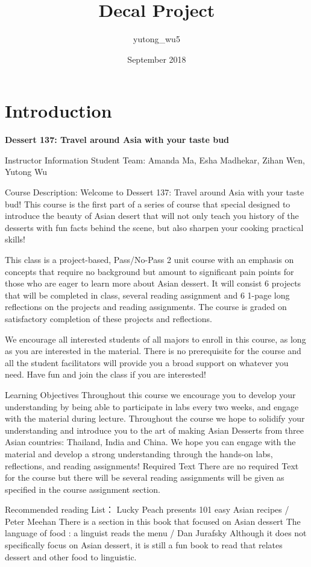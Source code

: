 \documentclass{article}
\title{Decal Project}
\author{yutong_wu5 }
\date{September 2018}
\begin{document}
\maketitle

\section{Introduction}

\textbf{Dessert 137: Travel around Asia with your taste bud}
\hfill

Instructor Information
Student Team: Amanda Ma, Esha Madhekar, Zihan Wen, Yutong Wu

Course Description:
Welcome to Dessert 137: Travel around Asia with your taste bud! This course is the first part of a series of course that special designed to introduce the beauty of Asian desert that will not only teach you history of the desserts with fun facts behind the scene, but also sharpen your cooking practical skills!

This class is a project-based, Pass/No-Pass 2 unit course with an emphasis on concepts that require no background but amount to significant pain points for those who are eager to learn more about Asian dessert. It will consist 6 projects that will be completed in class, several reading assignment and 6 1-page long reflections on the projects and reading assignments. The course is graded on satisfactory completion of these projects and reflections.

We encourage all interested students of all majors to enroll in this course, as long as you are interested in the material. There is no prerequisite for the course and all the student facilitators will provide you a broad support on whatever you need. Have fun and join the class if you are interested!

Learning Objectives
Throughout this course we encourage you to develop your understanding by being able to participate in labs every two weeks, and engage with the material during lecture. Throughout the course we hope to solidify your understanding and introduce you to the art of making Asian Desserts from three Asian countries: Thailand, India and China. We hope you can engage with the material and develop a strong understanding through the hands-on labs, reflections, and reading assignments!
Required Text
There are no required Text for the course but there will be several reading assignments will be given as specified in the course assignment section. 

Recommended reading List：
Lucky Peach presents 101 easy Asian recipes / Peter Meehan 
There is a section in this book that focused on Asian dessert
The language of food : a linguist reads the menu / Dan Jurafsky
Although it does not specifically focus on Asian dessert, it is still a fun book to read that relates dessert and other food to linguistic.
\end{document}

